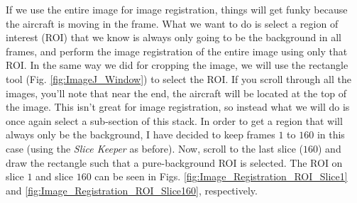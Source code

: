 \documentclass[letterpaper,12pt]{article}
\begin{document}
If we use the entire image for image registration, things will get funky because the aircraft is moving in the frame.  What we want to do is select a region of interest (ROI) that we know is always only going to be the background in all frames, and perform the image registration of the entire image using only that ROI.  In the same way we did for cropping the image, we will use the rectangle tool (Fig. \ref{fig:ImageJ_Window}) to select the ROI.  If you scroll through all the images, you'll note that near the end, the aircraft will be located at the top of the image.  This isn't great for image registration, so instead what we will do is once again select a sub-section of this stack.  In order to get a region that will always only be the background, I have decided to keep frames $1$ to $160$ in this case (using the \textcolor{myMagenta}{\textit{Slice Keeper}} as before).  Now, scroll to the last slice ($160$) and draw the rectangle such that a pure-background ROI is selected.  The ROI on slice $1$ and slice $160$ can be seen in Figs. \ref{fig:Image_Registration_ROI_Slice1} and \ref{fig:Image_Registration_ROI_Slice160}, respectively.
\end{document}
